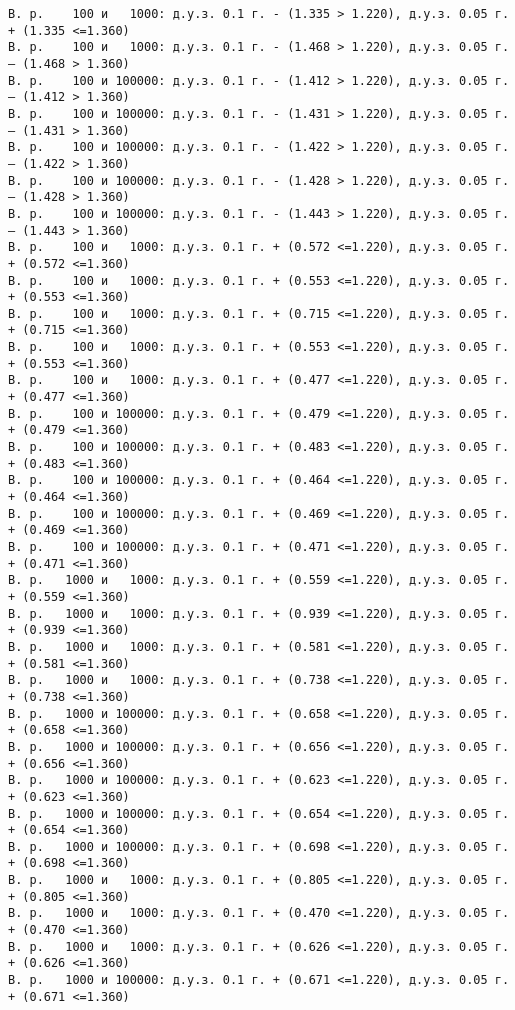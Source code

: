 \documentclass[11pt]{article}
\begin{document}
{\begin{Verbatim}[commandchars=\\\{\}]
В. р.    100 и   1000: д.у.з. 0.1 г. - (1.335 > 1.220), д.у.з. 0.05 г. + (1.335 <=1.360)
В. р.    100 и   1000: д.у.з. 0.1 г. - (1.468 > 1.220), д.у.з. 0.05 г. – (1.468 > 1.360)
В. р.    100 и 100000: д.у.з. 0.1 г. - (1.412 > 1.220), д.у.з. 0.05 г. – (1.412 > 1.360)
В. р.    100 и 100000: д.у.з. 0.1 г. - (1.431 > 1.220), д.у.з. 0.05 г. – (1.431 > 1.360)
В. р.    100 и 100000: д.у.з. 0.1 г. - (1.422 > 1.220), д.у.з. 0.05 г. – (1.422 > 1.360)
В. р.    100 и 100000: д.у.з. 0.1 г. - (1.428 > 1.220), д.у.з. 0.05 г. – (1.428 > 1.360)
В. р.    100 и 100000: д.у.з. 0.1 г. - (1.443 > 1.220), д.у.з. 0.05 г. – (1.443 > 1.360)
В. р.    100 и   1000: д.у.з. 0.1 г. + (0.572 <=1.220), д.у.з. 0.05 г. + (0.572 <=1.360)
В. р.    100 и   1000: д.у.з. 0.1 г. + (0.553 <=1.220), д.у.з. 0.05 г. + (0.553 <=1.360)
В. р.    100 и   1000: д.у.з. 0.1 г. + (0.715 <=1.220), д.у.з. 0.05 г. + (0.715 <=1.360)
В. р.    100 и   1000: д.у.з. 0.1 г. + (0.553 <=1.220), д.у.з. 0.05 г. + (0.553 <=1.360)
В. р.    100 и   1000: д.у.з. 0.1 г. + (0.477 <=1.220), д.у.з. 0.05 г. + (0.477 <=1.360)
В. р.    100 и 100000: д.у.з. 0.1 г. + (0.479 <=1.220), д.у.з. 0.05 г. + (0.479 <=1.360)
В. р.    100 и 100000: д.у.з. 0.1 г. + (0.483 <=1.220), д.у.з. 0.05 г. + (0.483 <=1.360)
В. р.    100 и 100000: д.у.з. 0.1 г. + (0.464 <=1.220), д.у.з. 0.05 г. + (0.464 <=1.360)
В. р.    100 и 100000: д.у.з. 0.1 г. + (0.469 <=1.220), д.у.з. 0.05 г. + (0.469 <=1.360)
В. р.    100 и 100000: д.у.з. 0.1 г. + (0.471 <=1.220), д.у.з. 0.05 г. + (0.471 <=1.360)
В. р.   1000 и   1000: д.у.з. 0.1 г. + (0.559 <=1.220), д.у.з. 0.05 г. + (0.559 <=1.360)
В. р.   1000 и   1000: д.у.з. 0.1 г. + (0.939 <=1.220), д.у.з. 0.05 г. + (0.939 <=1.360)
В. р.   1000 и   1000: д.у.з. 0.1 г. + (0.581 <=1.220), д.у.з. 0.05 г. + (0.581 <=1.360)
В. р.   1000 и   1000: д.у.з. 0.1 г. + (0.738 <=1.220), д.у.з. 0.05 г. + (0.738 <=1.360)
В. р.   1000 и 100000: д.у.з. 0.1 г. + (0.658 <=1.220), д.у.з. 0.05 г. + (0.658 <=1.360)
В. р.   1000 и 100000: д.у.з. 0.1 г. + (0.656 <=1.220), д.у.з. 0.05 г. + (0.656 <=1.360)
В. р.   1000 и 100000: д.у.з. 0.1 г. + (0.623 <=1.220), д.у.з. 0.05 г. + (0.623 <=1.360)
В. р.   1000 и 100000: д.у.з. 0.1 г. + (0.654 <=1.220), д.у.з. 0.05 г. + (0.654 <=1.360)
В. р.   1000 и 100000: д.у.з. 0.1 г. + (0.698 <=1.220), д.у.з. 0.05 г. + (0.698 <=1.360)
В. р.   1000 и   1000: д.у.з. 0.1 г. + (0.805 <=1.220), д.у.з. 0.05 г. + (0.805 <=1.360)
В. р.   1000 и   1000: д.у.з. 0.1 г. + (0.470 <=1.220), д.у.з. 0.05 г. + (0.470 <=1.360)
В. р.   1000 и   1000: д.у.з. 0.1 г. + (0.626 <=1.220), д.у.з. 0.05 г. + (0.626 <=1.360)
В. р.   1000 и 100000: д.у.з. 0.1 г. + (0.671 <=1.220), д.у.з. 0.05 г. + (0.671 <=1.360)

\end{Verbatim}}
\end{document}
